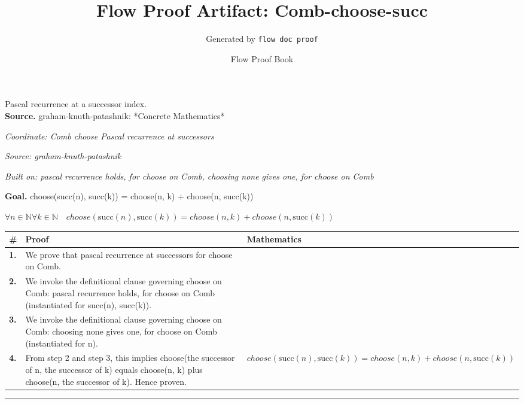 \documentclass[11pt]{article}
\title{Flow Proof Artifact: Comb-choose-succ}
\author{Generated by \texttt{flow doc proof}}
\date{Flow Proof Book}
\theoremstyle{definition}
\begin{document}
\maketitle
Pascal recurrence at a successor index.\\[0.5em]
\textbf{Source.} graham-knuth-patashnik: *Concrete Mathematics*\\[0.5em]
\bigskip
{}\par
\smallskip\noindent\textit{Coordinate: Comb \cdot choose \cdot Pascal recurrence at successors}\par
\smallskip\noindent\textit{Source: graham-knuth-patashnik}\par
\smallskip\noindent\textit{Built on: pascal recurrence holds, for choose on Comb, choosing none gives one, for choose on Comb}\par
\medskip
\noindent\textbf{Goal.} choose(succ(n), succ(k)) = choose(n, k) + choose(n, succ(k))\par
\noindent$\displaystyle \forall n \in \mathbb{N} \forall k \in \mathbb{N}\quad choose(\mathrm{succ}(n), \mathrm{succ}(k)) = choose(n, k) + choose(n, \mathrm{succ}(k))$\par
\medskip
\noindent
\begin{tabular}{@{} >{\raggedright\arraybackslash}p{} >{\raggedright\arraybackslash}p{} >{\raggedleft\arraybackslash}p{} @{}}
\textbf{\#} & \textbf{Proof} & \textbf{Mathematics} \\
\midrule
\textbf{1.} & We prove that pascal recurrence at successors for choose on Comb. & \\[0.45em]
\textbf{2.} & We invoke the definitional clause governing choose on Comb: pascal recurrence holds, for choose on Comb (instantiated for succ(n), succ(k)). & \\[0.45em]
\textbf{3.} & We invoke the definitional clause governing choose on Comb: choosing none gives one, for choose on Comb (instantiated for n). & \\[0.45em]
\textbf{4.} & From step 2 and step 3, this implies choose(the successor of n, the successor of k) equals choose(n, k) plus choose(n, the successor of k). Hence proven. & $\displaystyle choose(\mathrm{succ}(n), \mathrm{succ}(k)) = choose(n, k) + choose(n, \mathrm{succ}(k))$ \\[0.45em]
\bottomrule
\end{tabular}
\label{thm:Comb-choose-pascal_recurrence_at_successors}
\par\medskip\hrule
\end{document}
